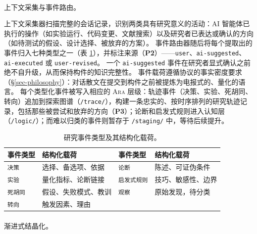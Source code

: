 \documentclass[
]{article}
\makeatletter
\let\oldparagraph\paragraph
\renewcommand{\paragraph}{
    \@ifstar
      \xxxParagraphStar
      \xxxParagraphNoStar
  }
\newcommand{\xxxParagraphStar}[1]{\oldparagraph*{#1}\mbox{}}
\newcommand{\xxxParagraphNoStar}[1]{\oldparagraph{#1}\mbox{}}
\newcommand{\passthrough}[1]{#1}
\theoremstyle{definition}
\newcommand{\ara}{\textsc{Ara}}
\makeatother
\begin{document}
\paragraph{上下文采集与事件路由。}\label{ux4e0aux4e0bux6587ux91c7ux96c6ux4e0eux4e8bux4ef6ux8defux7531}

上下文采集器扫描完整的会话记录，识别两类具有研究意义的活动：AI
智能体已执行的操作（如实验运行、代码变更、文献搜索）以及研究者已表达或确认的方向（如待测试的假设、设计选择、被放弃的方案）。
事件路由器随后将每个提取出的事件归入七种类型之一（表
\ref{tbl-event-types}），并标注来源（\textbf{P2}）------\passthrough{\lstinline!user!}、\passthrough{\lstinline!ai-suggested!}、\passthrough{\lstinline!ai-executed!}
或 \passthrough{\lstinline!user-revised!}。 一个
\passthrough{\lstinline!ai-suggested!}
事件在研究者显式确认之前绝不自升级，从而保持构件的知识完整性。
事件载荷遵循协议的事实密度要求（\S\ref{sec-philosophy}）：对话散文在提交到构件之前被提炼为电报式的、量化的语言。
每个类型化事件被写入相应的 \ara{}
层级：轨迹事件（决策、实验、死胡同、转向）追加到探索图谱（\passthrough{\lstinline!/trace/!}），构建一条忠实的、按时序排列的研究轨迹记录，包括那些被尝试和放弃的方向（\textbf{P3}）；论断和启发式规则进入认知层（\passthrough{\lstinline!/logic/!}）；而难以归类的事件则暂存于
\passthrough{\lstinline!/staging/!} 中，等待后续提升。

\begin{table}[htbp]
\centering
\small
\begin{tabular}{llll}
\toprule
\textbf{事件类型} & \textbf{结构化载荷} & \textbf{事件类型} & \textbf{结构化载荷} \\
\midrule
\texttt{决策} & 选择、备选项、依据 & \texttt{论断} & 陈述、可证伪条件 \\
\texttt{实验} & 量化指标、论断链接 & \texttt{启发式规则} & 技巧、敏感性、边界 \\
\texttt{死胡同} & 假设、失败模式、教训 & \texttt{观察} & 原始发现，待分类 \\
\texttt{转向} & 触发因素、理由 &  &  \\
\bottomrule
\end{tabular}
\caption[研究事件类型及其结构化载荷]{研究事件类型及其结构化载荷。}
\label{tbl-event-types}
\end{table}

\paragraph{渐进式结晶化。}\label{ux6e10ux8fdbux5f0fux7ed3ux6676ux5316}
\end{document}
